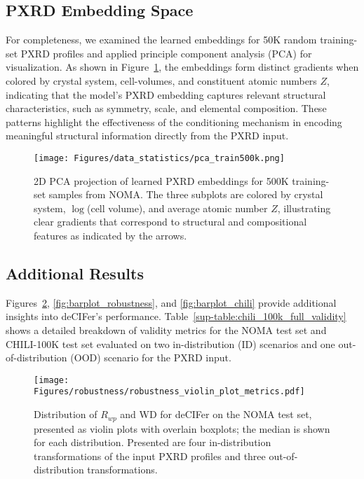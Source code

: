 \subsection{PXRD Embedding Space} 

For completeness, we examined the learned embeddings for 50K random training-set PXRD profiles and applied principle component analysis (PCA) for visualization. As shown in Figure~\ref{fig:pca_embeddings}, the embeddings form distinct gradients when colored by crystal system, cell-volumes, and constituent atomic numbers $Z$, indicating that the model's PXRD embedding captures relevant structural characteristics, such as symmetry, scale, and elemental composition. These patterns highlight the effectiveness of the conditioning mechanism in encoding meaningful structural information directly from the PXRD input.

\begin{figure}[t!]
\vskip 0.2in
\begin{center}
\centerline{\texttt{[image: Figures/data\_statistics/pca\_train500k.png]}}
\caption{2D PCA projection of learned PXRD embeddings for 500K training-set samples from NOMA. The three subplots are colored by crystal system, $\log$(cell volume), and average atomic number $Z$, illustrating clear gradients that correspond to structural and compositional features as indicated by the arrows.} \label{fig:pca_embeddings}
\end{center}
\vskip -0.2in
\end{figure}

\subsection{Additional Results}\label{sup-sec:additional_results}

Figures~\ref{fig:violinplot_robustness}, \ref{fig:barplot_robustness}, and \ref{fig:barplot_chili} provide additional insights into deCIFer's performance. Table~\ref{sup-table:chili_100k_full_validity} shows a detailed breakdown of validity metrics for the NOMA test set and CHILI-100K test set evaluated on two in-distribution (ID) scenarios and one out-of-distribution (OOD) scenario for the PXRD input.

\begin{figure}[t!]
\vskip 0.2in
\begin{center}
\centerline{\texttt{[image: Figures/robustness/robustness\_violin\_plot\_metrics.pdf]}}
\caption{
Distribution of $R_{wp}$ and WD for deCIFer on the NOMA test set, presented as violin plots with overlain boxplots; the median is shown for each distribution. Presented are four in-distribution transformations of the input PXRD profiles and three out-of-distribution transformations.
}
\label{fig:violinplot_robustness}
\end{center}
\vskip -0.2in
\end{figure}

